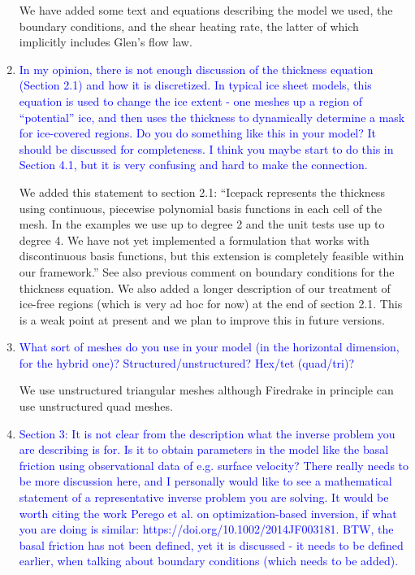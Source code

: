 \documentclass{article}
\theoremstyle{definition}
\theoremstyle{plain}
\begin{document}
\begin{enumerate}
We have added some text and equations describing the model we used, the boundary conditions, and the shear heating rate, the latter of which implicitly includes Glen's flow law.
\item \textcolor{blue}{In my opinion, there is not enough discussion of the thickness equation (Section 2.1) and how it
is discretized. In typical ice sheet models, this equation is used to change the ice extent - one
meshes up a region of ``potential'' ice, and then uses the thickness to dynamically determine a mask
for ice-covered regions. Do you do something like this in your model? It should be discussed for
completeness. I think you maybe start to do this in Section 4.1, but it is very confusing and hard to
make the connection.}

We added this statement to section 2.1: ``Icepack represents the thickness using continuous, piecewise polynomial basis functions in each cell of the mesh.
In the examples we use up to degree 2 and the unit tests use up to degree 4.
We have not yet implemented a formulation that works with discontinuous basis functions, but this extension is completely feasible within our framework.''
See also previous comment on boundary conditions for the thickness equation.
We also added a longer description of our treatment of ice-free regions (which is very ad hoc for now) at the end of section 2.1.
This is a weak point at present and we plan to improve this in future versions.



\item \textcolor{blue}{What sort of meshes do you use in your model (in the horizontal dimension, for the hybrid one)?
Structured/unstructured? Hex/tet (quad/tri)?}

We use unstructured triangular meshes although Firedrake in principle can use unstructured quad meshes.
\item \textcolor{blue}{Section 3: It is not clear from the description what the inverse problem you are describing is for.
Is it to obtain parameters in the model like the basal friction using observational data of e.g. surface velocity? There really needs to be more discussion here, and I personally would like to see
a mathematical statement of a representative inverse problem you are solving. It would be worth
citing the work Perego et al. on optimization-based inversion, if what you are doing is similar:
https://doi.org/10.1002/2014JF003181. BTW, the basal friction has not been defined, yet it is
discussed - it needs to be defined earlier, when talking about boundary conditions (which needs to
be added).}


\end{enumerate}
\end{document}
